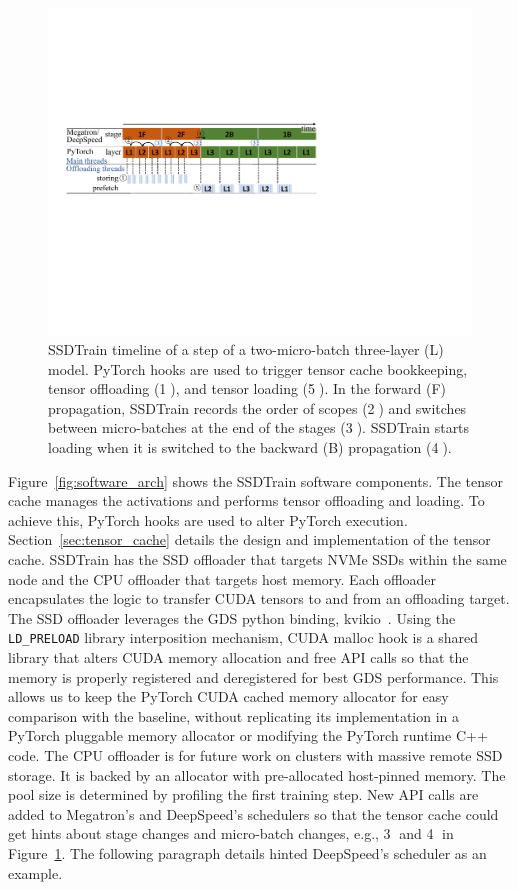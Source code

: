 \begin{figure}[!t]
\centering
\includegraphics[width=\linewidth]{figures/SSDTrain/Pipe.pdf}
\caption{\label{fig:pipe}SSDTrain timeline of a step of a two-micro-batch three-layer (L) model. PyTorch hooks are used to trigger tensor cache bookkeeping, tensor offloading (\textcircled{1}), and tensor loading (\textcircled{5}). In the forward (F) propagation, SSDTrain records the order of scopes (\textcircled{2}) and switches between micro-batches at the end of the stages (\textcircled{3}). SSDTrain starts loading when it is switched to the backward (B) propagation (\textcircled{4}). }
\end{figure}

Figure~\ref{fig:software_arch} shows the SSDTrain software components. 
The tensor cache manages the activations and performs tensor offloading and loading. To achieve this, PyTorch hooks are used to alter PyTorch execution. Section~\ref{sec:tensor_cache} details the design and implementation of the tensor cache. SSDTrain has the SSD offloader that targets NVMe SSDs within the same node and the CPU offloader that targets host memory. Each offloader encapsulates the logic to transfer CUDA tensors to and from an offloading target. The SSD offloader leverages the GDS python binding, kvikio~\cite{nvidiaRapidsaiKvikioKvikIO2022}. Using the \texttt{LD\_PRELOAD} library interposition mechanism, CUDA malloc hook is a shared library that alters CUDA memory allocation and free API calls so that the memory is properly registered and deregistered for best GDS performance. This allows us to keep the PyTorch CUDA cached memory allocator for easy comparison with the baseline, without replicating its implementation in a PyTorch pluggable memory allocator or modifying the PyTorch runtime C++ code. The CPU offloader is for future work on clusters with massive remote SSD storage. It is backed by an allocator with pre-allocated host-pinned memory. The pool size is determined by profiling the first training step. New API calls are added to Megatron's and DeepSpeed's schedulers so that the tensor cache could get hints about stage changes and micro-batch changes, e.g., \textcircled{3} and \textcircled{4} in Figure~\ref{fig:pipe}. The following paragraph details hinted DeepSpeed's scheduler as an example.

